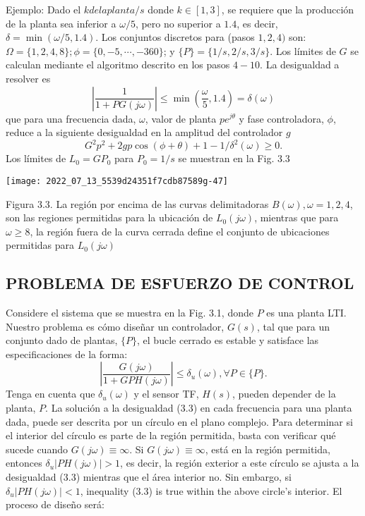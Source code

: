 Ejemplo: Dado el $k de la planta / s$ donde $k \in[1,3]$, se requiere que la producción de la planta sea inferior a $\omega / 5$, pero no superior a $1.4$, es decir, $\delta=\min (\omega / 5,1.4)$. Los conjuntos discretos para (pasos $1,2,4)$ son: $\Omega=\{1,2,4,8\} ; \phi=\{0,-5, \cdots,-360\}$; y $\{P\}=\{1 / s, 2 / s, 3 / s\}$. Los límites de $G$ se calculan mediante el algoritmo descrito en los pasos $4-10$. La desigualdad a resolver es
$$
\left|\frac{1}{1+P G(j \omega)}\right| \leq \min \left(\frac{\omega}{5}, 1.4\right)=\delta(\omega)
$$
que para una frecuencia dada, $\omega$, valor de planta $p e^{j \theta}$ y fase controladora, $\phi$, reduce a la siguiente desigualdad en la amplitud del controlador $g$
$$
G^{2} p^{2}+2 g p \cos (\phi+\theta)+1-1 / \delta^{2}(\omega) \geq 0 .
$$
Los límites de $L_{0}=G P_{0}$ para $P_{0}=1 / s$ se muestran en la Fig. $3.3$

\texttt{[image: 2022\_07\_13\_5539d24351f7cdb87589g-47]}

Figura 3.3. La región por encima de las curvas delimitadoras $B(\omega), \omega=1,2,4$, son las regiones permitidas para la ubicación de $L_{0}(j \omega)$, mientras que para $\omega \geq 8$, la región fuera de la curva cerrada define el conjunto de ubicaciones permitidas para $L_{0}(j \omega)$

\subsection{PROBLEMA DE ESFUERZO DE CONTROL}
Considere el sistema que se muestra en la Fig. 3.1, donde $P$ es una planta LTI. Nuestro problema es cómo diseñar un controlador, $G(s)$, tal que para un conjunto dado de plantas, $\{P\}$, el bucle cerrado es estable y satisface las especificaciones de la forma:
$$
\left|\frac{G(j \omega)}{1+G P H(j \omega)}\right| \leq \delta_{u}(\omega), \forall P \in\{P\} .
$$
Tenga en cuenta que $\delta_{u}(\omega)$ y el sensor TF, $H(s)$, pueden depender de la planta, $P$. La solución a la desigualdad (3.3) en cada frecuencia para una planta dada, puede ser descrita por un círculo en el plano complejo. Para determinar si el interior del círculo es parte de la región permitida, basta con verificar qué sucede cuando $G(j \omega) \equiv \infty$. Si $G(j \omega) \equiv \infty$, está en la región permitida, entonces $\delta_{u}| P H(j \omega)|>1$, es decir, la región exterior a este círculo se ajusta a la desigualdad (3.3) mientras que el área interior no. Sin embargo, si $\delta_{u}| P H(j \omega)|<1$, inequality (3.3) is true within the above circle's interior. El proceso de diseño será:

